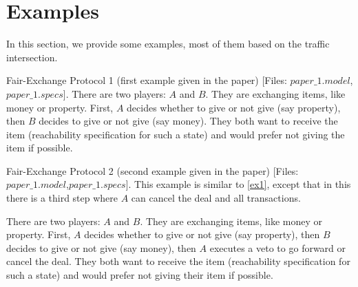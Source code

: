 \documentclass[format=acmsmall, review=false]{acmart}
\begin{document}
\section{Examples}
In this section, we provide some examples, most of them based on the traffic intersection.

\begin{example}\label{ex1}\cite{chatterjee2014doomsday}
Fair-Exchange Protocol 1 (first example given in the paper) [Files: $paper\_1.model$, $paper\_1.specs$]. There are two players: $A$ and $B$. They are exchanging items, like money or property. First, $A$ decides whether to give or not give (say property), then $B$ decides to give or not give (say money). They both want to receive the item (reachability specification for such a state) and would prefer not giving the item if possible.
\end{example}

\begin{example}\label{ex2}\cite{chatterjee2014doomsday}
Fair-Exchange Protocol 2 (second example given in the paper) [Files: $paper\_1.model$,$paper\_1.specs$]. This example is similar to \ref{ex1}, except that in this there is a third step where $A$ can cancel the deal and all transactions.

There are two players: $A$ and $B$. They are exchanging items, like money or property. First, $A$ decides whether to give or not give (say property), then $B$ decides to give or not give (say money), then $A$ executes a veto to go forward or cancel the deal. They both want to receive the item (reachability specification for such a state) and would prefer not giving their item if possible.
\end{example}
\end{document}
